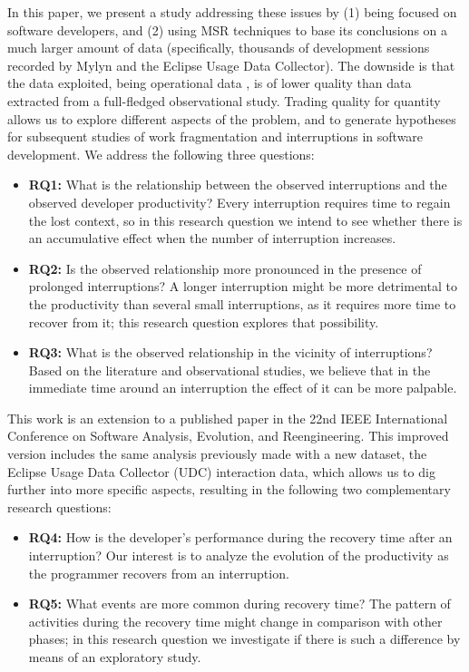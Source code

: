 \documentclass[times]{smrauth}
\begin{document}
In this paper, we present a study addressing these issues by (1) being focused on software developers, and (2) using MSR techniques to base its conclusions on a much larger amount of data (specifically, thousands of development sessions recorded by Mylyn and the Eclipse Usage Data Collector). The downside is that the data exploited, being operational data \cite{M14}, is of lower quality than data extracted from a full-fledged observational study. Trading quality for quantity allows us to explore different aspects of the problem, and to generate hypotheses for subsequent studies of work fragmentation and interruptions in software development. We address the following three questions:
\begin{itemize}
\item \textbf{RQ1:} What is the relationship between the observed interruptions and the observed developer productivity? Every interruption requires time to regain the lost context, so in this research question we intend to see whether there is an accumulative effect when the number of interruption increases.
\item \textbf{RQ2:} Is the observed relationship more pronounced in the presence of prolonged interruptions? A longer interruption might be more detrimental to the productivity than several small interruptions, as it requires more time to recover from it; this research question explores that possibility.
\item \textbf{RQ3:}  What is the observed relationship in the vicinity of interruptions? Based on the literature and observational studies, we believe that in the immediate time around an interruption the effect of it can be more palpable.
\end{itemize}

This work is an extension to a published paper in the 22nd IEEE International Conference on Software Analysis, Evolution, and Reengineering. This improved version includes the same analysis previously made with a new dataset, the Eclipse Usage Data Collector (UDC) interaction data, which allows us to dig further into more specific aspects, resulting in the following two complementary research questions:
\begin{itemize}
\item \textbf{RQ4:} How is the developer's performance during the recovery time after an interruption? Our interest is to analyze the evolution of the productivity as the programmer recovers from an interruption.
\item \textbf{RQ5:} What events are more common during recovery time? The pattern of activities during the recovery time might change in comparison with other phases; in this research question we investigate if there is such a difference by means of an exploratory study.
\end{itemize}
\end{document}
